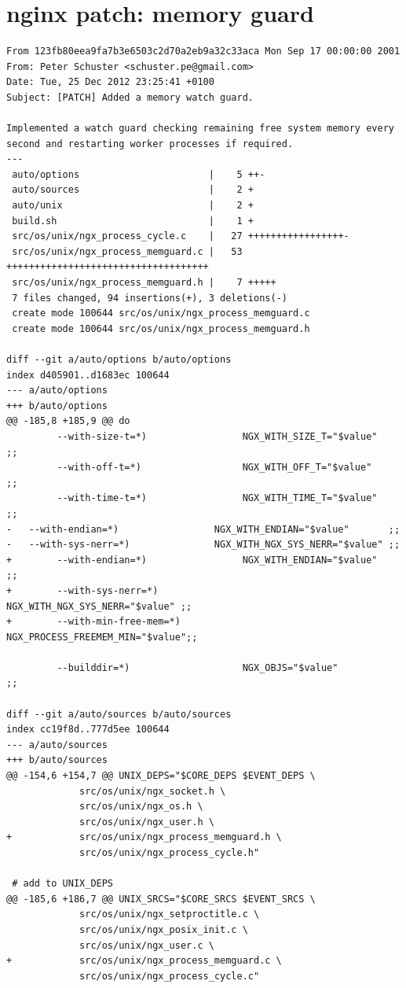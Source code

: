 \section{nginx patch: memory guard}
\label{appendix:memguard}

\begin{verbatim}
From 123fb80eea9fa7b3e6503c2d70a2eb9a32c33aca Mon Sep 17 00:00:00 2001
From: Peter Schuster <schuster.pe@gmail.com>
Date: Tue, 25 Dec 2012 23:25:41 +0100
Subject: [PATCH] Added a memory watch guard.

Implemented a watch guard checking remaining free system memory every
second and restarting worker processes if required.
---
 auto/options                       |    5 ++-
 auto/sources                       |    2 +
 auto/unix                          |    2 +
 build.sh                           |    1 +
 src/os/unix/ngx_process_cycle.c    |   27 +++++++++++++++++-
 src/os/unix/ngx_process_memguard.c |   53 ++++++++++++++++++++++++++++++++++++
 src/os/unix/ngx_process_memguard.h |    7 +++++
 7 files changed, 94 insertions(+), 3 deletions(-)
 create mode 100644 src/os/unix/ngx_process_memguard.c
 create mode 100644 src/os/unix/ngx_process_memguard.h

diff --git a/auto/options b/auto/options
index d405901..d1683ec 100644
--- a/auto/options
+++ b/auto/options
@@ -185,8 +185,9 @@ do
         --with-size-t=*)                 NGX_WITH_SIZE_T="$value"       ;;
         --with-off-t=*)                  NGX_WITH_OFF_T="$value"        ;;
         --with-time-t=*)                 NGX_WITH_TIME_T="$value"       ;;
-	--with-endian=*)                 NGX_WITH_ENDIAN="$value"   	;;
-	--with-sys-nerr=*)               NGX_WITH_NGX_SYS_NERR="$value" ;;
+        --with-endian=*)                 NGX_WITH_ENDIAN="$value"       ;;
+        --with-sys-nerr=*)               NGX_WITH_NGX_SYS_NERR="$value" ;;
+        --with-min-free-mem=*)           NGX_PROCESS_FREEMEM_MIN="$value";;
 
         --builddir=*)                    NGX_OBJS="$value"          ;;
 
diff --git a/auto/sources b/auto/sources
index cc19f8d..777d5ee 100644
--- a/auto/sources
+++ b/auto/sources
@@ -154,6 +154,7 @@ UNIX_DEPS="$CORE_DEPS $EVENT_DEPS \
             src/os/unix/ngx_socket.h \
             src/os/unix/ngx_os.h \
             src/os/unix/ngx_user.h \
+            src/os/unix/ngx_process_memguard.h \
             src/os/unix/ngx_process_cycle.h"
 
 # add to UNIX_DEPS
@@ -185,6 +186,7 @@ UNIX_SRCS="$CORE_SRCS $EVENT_SRCS \
             src/os/unix/ngx_setproctitle.c \
             src/os/unix/ngx_posix_init.c \
             src/os/unix/ngx_user.c \
+            src/os/unix/ngx_process_memguard.c \
             src/os/unix/ngx_process_cycle.c"
 

\end{verbatim}
